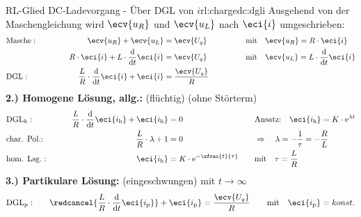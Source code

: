 \begin{frame}[t]
{\begin{bsp}{RL-Glied DC-Ladevorgang - Über DGL von $i$}{rl:chargedc:dgli}
    Ausgehend von der Maschengleichung wird $\ecv{u_R}$ und $\ecv{u_L}$ nach $\eci{i}$ umgeschrieben:%
    \begingroup%
        \addtolength{\jot}{2pt}%
    \begin{align*}
        &\text{Masche}:&&&
            \ecv{u_R} + \ecv{u_L}  &= \ecv{U_q}&&&
            &\text{mit}\quad \ecv{u_R} = R \cdot \eci{i} \\
        &&&&
            R \cdot \eci{i} + L \cdot \frac{\mathrm{d}}{\mathrm{d}t} \eci{i} &= \ecv{U_q} &&&
            &\text{mit}\quad \ecv{u_L} = L \cdot \frac{\mathrm{d}}{\mathrm{d}t} \eci{i} \\
        &\text{DGL}:&&&
        \frac{L}{R} \cdot \frac{\mathrm{d}}{\mathrm{d}t} \eci{i}  + \eci{i}  &= \frac{\ecv{U_q}}{R}
        \\[-15pt]&\hphantom{R1oooooooooo}&&&\hphantom{L3ooooooooooo}&\hphantom{R3ooooooooooooooo}&&&&\hphantom{R5oooooooooooooooooo}\nonumber%
    \end{align*}%
    \textbf{2.) Homogene Lösung, allg.:} (flüchtig) (ohne Störterm)%
    \begin{align*}%
        &\text{DGL}_{h}:&&&
            \frac{L}{R} \cdot \frac{\mathrm{d}}{\mathrm{d}t} \eci{i_{\mathrm h}} + \eci{i_{\mathrm h}} &= 0 &&&
                &\text{Ansatz:}\quad
                \eci{i_{\mathrm h}} = K \cdot \mathrm{e}^{\lambda t}\\
        &\text{char. Pol.:}&&&
            \frac{L}{R} \cdot \lambda + 1 &= 0 &&&
                &\Rightarrow\quad \lambda = -\frac{1}{\tau} = -\frac{R}{L}\\
        &\text{hom. Lsg.}:&&&
            \eci{i_{\mathrm h}} &= K \cdot \mathrm{e}^{-\sfrac{t}{\tau}}&&&
                &\text{mit}\quad \tau = \frac{L}{R}
        \\[-15pt]&\hphantom{R1oooooooooo}&&&\hphantom{L3ooooooooooo}&\hphantom{R3ooooooooooooooo}&&&&\hphantom{R5oooooooooooooooooo}\nonumber%
    \end{align*}%
    \textbf{3.) Partikulare Lösung:} (eingeschwungen) mit $t \to \infty$%
    \begin{align*}%
        &\text{DGL}_{p}:&&&
            \redcancel{\frac{L}{R} \cdot \frac{\mathrm{d}}{\mathrm{d}t} \eci{i_{\mathrm p}}} + \eci{i_{\mathrm p}} &= \frac{\ecv{U_q}}{R} &&&
                &\text{mit}\quad \eci{i_{\mathrm p}} = konst.  \\

\end{align*}
\end{bsp}}
\end{frame}
